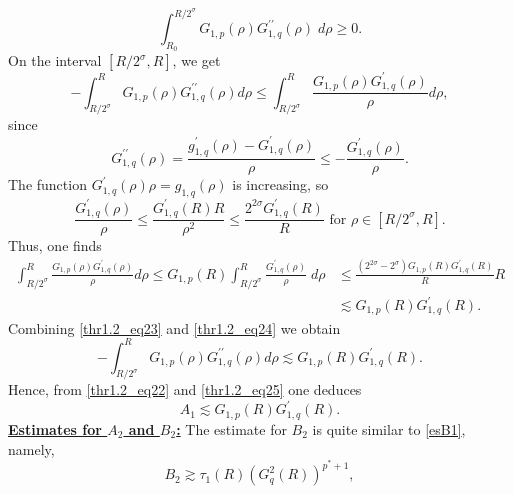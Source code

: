 \documentclass[11pt,reqno]{amsart}
\newcommand{\di}{\displaystyle}
\numberwithin{equation}{section}
\newtheorem{proposition}[theorem]{Proposition}
\begin{document}
\begin{equation}\label{thr1.2_eq22}
\int^{R/2^{\sigma}}_{R_0}G_{1,p}(\rho)G^{\prime \prime}_{1,q}(\rho)\;d\rho\geq 0.
\end{equation}
On the interval $[R/2^{\sigma},R]$, we get
\begin{equation}\label{thr1.2_eq23}
-\di\int^R_{R/2^{\sigma}} G_{1,p}(\rho) G^{\prime \prime}_{1,q}(\rho) d\rho\leq\int^R_{R/2^{\sigma}} \frac{G_{1,p}(\rho)G^{\prime}_{1,q}(\rho)}{\rho} d\rho,
\end{equation}
since
\[
G^{\prime \prime}_{1,q}(\rho)=\frac{g^{\prime}_{1,q}(\rho)-G^{\prime}_{1,q}(\rho)}{\rho}\leq -\frac{G^{\prime}_{1,q}(\rho)}{\rho}.
\]
The function $G^{\prime}_{1,q}(\rho)\rho= g_{1,q}(\rho)$ is increasing, so
\[
\frac{G^{\prime}_{1,q}(\rho)}{\rho}\leq \frac{G^{\prime}_{1,q}(R)R}{\rho^2}\leq \frac{2^{2\sigma}G^{\prime}_{1,q}(R)}{R}\text{ for $\rho\in \left[R/2^{\sigma},R\right]$}.
\]
Thus, one finds
\begin{align}
\int^R_{R/2^{\sigma}}\frac{G_{1,p}(\rho)G^{\prime}_{1,q}(\rho)}{\rho}d\rho\leq G_{1,p}(R)\int^{R}_{R/2^{\sigma}}\frac{G^{\prime}_{1,q}(\rho)}{\rho}\;d \rho&\leq \frac{(2^{2\sigma}-2^{\sigma})G_{1,p}(R)G^{\prime}_{1,q}(R)}{R}R\nonumber\\
&\lesssim G_{1,p}(R)G^{\prime}_{1,q}(R).\label{thr1.2_eq24}
\end{align}
Combining \eqref{thr1.2_eq23} and \eqref{thr1.2_eq24} we obtain 
\begin{equation}\label{thr1.2_eq25}
    -\di\int^R_{R/2^{\sigma}} G_{1,p}(\rho) G^{\prime \prime}_{1,q}(\rho) d\rho\lesssim G_{1,p}(R)G^{\prime}_{1,q}(R).
\end{equation}
Hence, from \eqref{thr1.2_eq22} and \eqref{thr1.2_eq25} one deduces
\begin{equation}
A_1\lesssim G_{1,p}(R)G^{\prime}_{1,q}(R).\label{esA1}
\end{equation}
\noindent \underline{{\bf Estimates for $A_2$ and $B_2$:}}
The estimate for $B_2$ is quite similar to \eqref{esB1}, namely,
\begin{equation}\label{esB2}
B_2\gtrsim \tau_1(R)\left(G^{2}_q(R)\right)^{p^*+1},
\end{equation}
\end{document}
